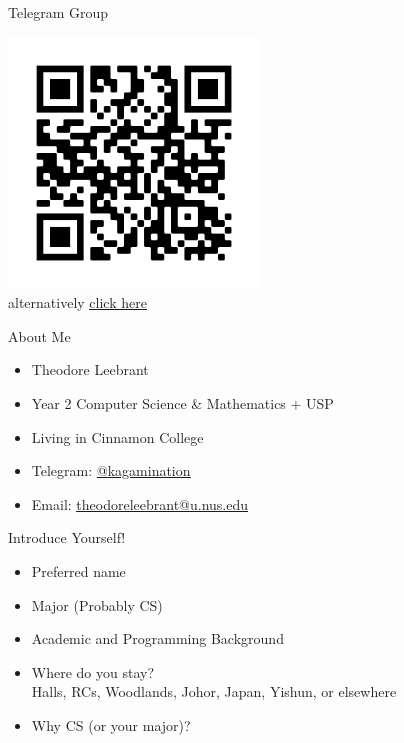 \documentclass[10pt]{beamer}
\begin{document}
\begin{frame}[fragile]{Telegram Group}
\begin{center}
  \includegraphics[width=0.5\textwidth]{teleqr.png} \\
  alternatively \href{https://t.me/joinchat/DJDbrBmLMZciD4D4Z_Bodw}{\underline{click here}}
\end{center}
\end{frame}

\begin{frame}[fragile]{About Me}
  \begin{itemize}
    \item Theodore Leebrant
    \item Year 2 Computer Science \& Mathematics + USP
    \item Living in Cinnamon College
    \item Telegram: \href{https://t.me/kagamination}{@\underline{kagamination}}
    \item Email: \href{mailto:theodoreleebrant@u.nus.edu}{\underline{theodoreleebrant@u.nus.edu}}
  \end{itemize}
\end{frame}

\begin{frame}[fragile]{Introduce Yourself!}
  \begin{itemize}
    \item Preferred name
    \item Major (Probably CS)
    \item Academic and Programming Background
    \item Where do you stay?  \\ Halls, RCs, Woodlands, Johor, Japan, Yishun, or elsewhere
    \item Why CS (or your major)?
  \end{itemize}
\end{frame}
\end{document}
